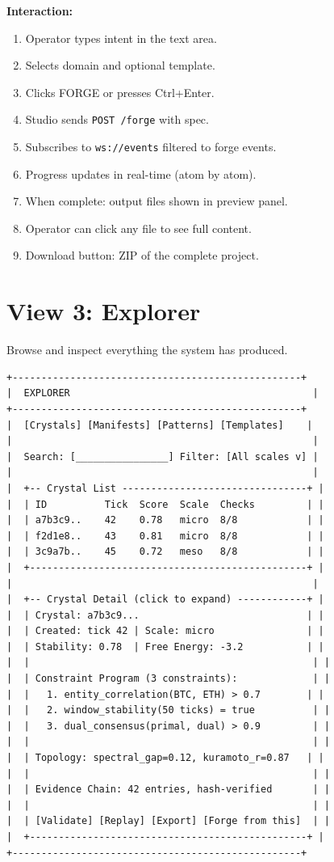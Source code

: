 \documentclass[11pt,a4paper,twoside]{article}
\begin{document}
\textbf{Interaction:}
\begin{enumerate}[nosep]
  \item Operator types intent in the text area.
  \item Selects domain and optional template.
  \item Clicks FORGE or presses Ctrl+Enter.
  \item Studio sends \texttt{POST /forge} with spec.
  \item Subscribes to \texttt{ws://events} filtered to forge events.
  \item Progress updates in real-time (atom by atom).
  \item When complete: output files shown in preview panel.
  \item Operator can click any file to see full content.
  \item Download button: ZIP of the complete project.
\end{enumerate}


\section{View 3: Explorer}\label{sec:explorer}

Browse and inspect everything the system has produced.

\begin{lstlisting}[title={Explorer Layout}]
+--------------------------------------------------+
|  EXPLORER                                          |
+--------------------------------------------------+
|  [Crystals] [Manifests] [Patterns] [Templates]    |
|                                                    |
|  Search: [________________] Filter: [All scales v] |
|                                                    |
|  +-- Crystal List --------------------------------+ |
|  | ID          Tick  Score  Scale  Checks         | |
|  | a7b3c9..    42    0.78   micro  8/8            | |
|  | f2d1e8..    43    0.81   micro  8/8            | |
|  | 3c9a7b..    45    0.72   meso   8/8            | |
|  +------------------------------------------------+ |
|                                                    |
|  +-- Crystal Detail (click to expand) ------------+ |
|  | Crystal: a7b3c9...                             | |
|  | Created: tick 42 | Scale: micro                | |
|  | Stability: 0.78  | Free Energy: -3.2           | |
|  |                                                 | |
|  | Constraint Program (3 constraints):             | |
|  |   1. entity_correlation(BTC, ETH) > 0.7        | |
|  |   2. window_stability(50 ticks) = true          | |
|  |   3. dual_consensus(primal, dual) > 0.9         | |
|  |                                                 | |
|  | Topology: spectral_gap=0.12, kuramoto_r=0.87   | |
|  |                                                 | |
|  | Evidence Chain: 42 entries, hash-verified       | |
|  |                                                 | |
|  | [Validate] [Replay] [Export] [Forge from this]  | |
|  +------------------------------------------------+ |
+--------------------------------------------------+
\end{lstlisting}
\end{document}
